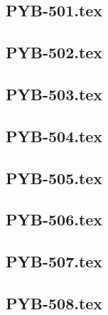 \renewcommand{\xxexo}{PYB-501.tex} 
\subsection*{\xxexo} 
\graphicspath{{../../exos/python_bases/PYB-501/}}
 
 
\renewcommand{\xxexo}{PYB-502.tex} 
\subsection*{\xxexo} 
\graphicspath{{../../exos/python_bases/PYB-502/}}
 
 
\renewcommand{\xxexo}{PYB-503.tex} 
\subsection*{\xxexo} 
\graphicspath{{../../exos/python_bases/PYB-503/}}
 
 
\renewcommand{\xxexo}{PYB-504.tex} 
\subsection*{\xxexo} 
\graphicspath{{../../exos/python_bases/PYB-504/}}
 
 
\renewcommand{\xxexo}{PYB-505.tex} 
\subsection*{\xxexo} 
\graphicspath{{../../exos/python_bases/PYB-505/}}
 
 
\renewcommand{\xxexo}{PYB-506.tex} 
\subsection*{\xxexo} 
\graphicspath{{../../exos/python_bases/PYB-506/}}
 
 
\renewcommand{\xxexo}{PYB-507.tex} 
\subsection*{\xxexo} 
\graphicspath{{../../exos/python_bases/PYB-507/}}
 
 
\renewcommand{\xxexo}{PYB-508.tex} 
\subsection*{\xxexo} 
\graphicspath{{../../exos/python_bases/PYB-508/}}
 
 
